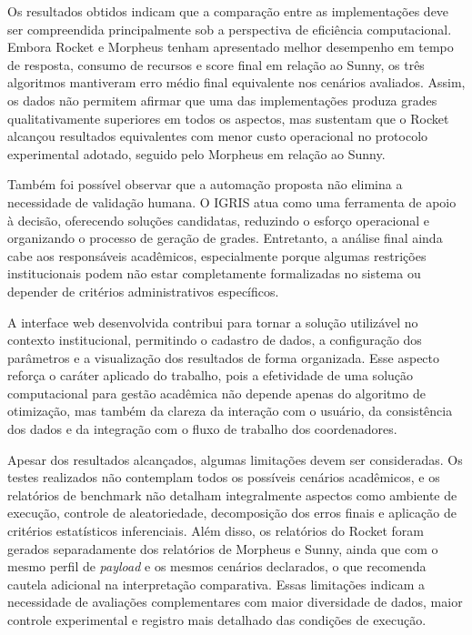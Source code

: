 Os resultados obtidos indicam que a comparação entre as implementações deve ser compreendida principalmente sob a perspectiva de eficiência computacional. Embora Rocket e Morpheus tenham apresentado melhor desempenho em tempo de resposta, consumo de recursos e score final em relação ao Sunny, os três algoritmos mantiveram erro médio final equivalente nos cenários avaliados. Assim, os dados não permitem afirmar que uma das implementações produza grades qualitativamente superiores em todos os aspectos, mas sustentam que o Rocket alcançou resultados equivalentes com menor custo operacional no protocolo experimental adotado, seguido pelo Morpheus em relação ao Sunny.

Também foi possível observar que a automação proposta não elimina a necessidade de validação humana. O IGRIS atua como uma ferramenta de apoio à decisão, oferecendo soluções candidatas, reduzindo o esforço operacional e organizando o processo de geração de grades. Entretanto, a análise final ainda cabe aos responsáveis acadêmicos, especialmente porque algumas restrições institucionais podem não estar completamente formalizadas no sistema ou depender de critérios administrativos específicos.

A interface web desenvolvida contribui para tornar a solução utilizável no contexto institucional, permitindo o cadastro de dados, a configuração dos parâmetros e a visualização dos resultados de forma organizada. Esse aspecto reforça o caráter aplicado do trabalho, pois a efetividade de uma solução computacional para gestão acadêmica não depende apenas do algoritmo de otimização, mas também da clareza da interação com o usuário, da consistência dos dados e da integração com o fluxo de trabalho dos coordenadores.

Apesar dos resultados alcançados, algumas limitações devem ser consideradas. Os testes realizados não contemplam todos os possíveis cenários acadêmicos, e os relatórios de benchmark não detalham integralmente aspectos como ambiente de execução, controle de aleatoriedade, decomposição dos erros finais e aplicação de critérios estatísticos inferenciais. Além disso, os relatórios do Rocket foram gerados separadamente dos relatórios de Morpheus e Sunny, ainda que com o mesmo perfil de \textit{payload} e os mesmos cenários declarados, o que recomenda cautela adicional na interpretação comparativa. Essas limitações indicam a necessidade de avaliações complementares com maior diversidade de dados, maior controle experimental e registro mais detalhado das condições de execução.

